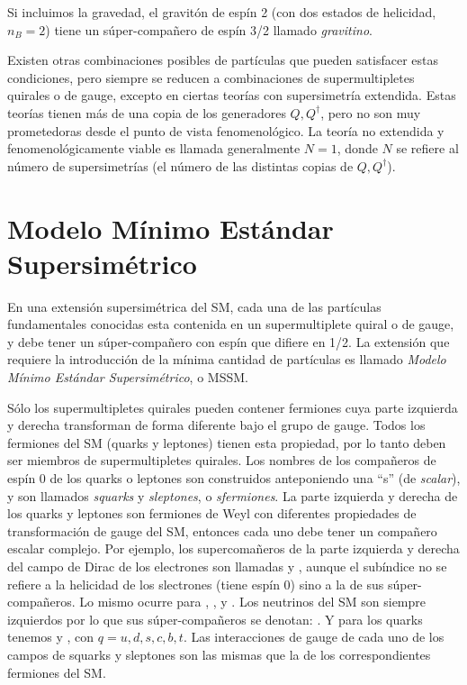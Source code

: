 Si incluimos la gravedad, el gravitón de espín 2 (con dos estados de helicidad,
$n_B=2$) tiene un súper-compañero de espín 3/2 llamado \emph{gravitino}.

Existen otras combinaciones posibles de partículas que pueden satisfacer estas
condiciones, pero siempre se reducen a combinaciones de supermultipletes
quirales o de gauge, excepto en ciertas teorías con supersimetría extendida.
Estas teorías tienen más de una copia de los generadores $Q, Q^\dagger$, pero no
son muy prometedoras desde el punto de vista fenomenológico. La teoría no
extendida y fenomenológicamente viable es llamada generalmente $N=1$, donde $N$
se refiere al número de supersimetrías (el número de las distintas copias de
$Q,Q^\dagger$).


\section{Modelo Mínimo Estándar Supersimétrico}

En una extensión supersimétrica del SM, cada una de las partículas fundamentales
conocidas esta contenida en un supermultiplete quiral o de gauge, y debe tener
un súper-compa\~nero con espín que difiere en 1/2. La extensión que requiere la
introducción de la mínima cantidad de partículas es llamado \emph{Modelo Mínimo
  Estándar Supersimétrico}, o MSSM.


Sólo los supermultipletes quirales pueden contener fermiones cuya parte
izquierda y derecha transforman de forma diferente bajo el grupo de gauge. Todos
los fermiones del SM (quarks y leptones) tienen esta propiedad, por lo tanto
deben ser miembros de supermultipletes quirales. Los nombres de los compañeros
de espín 0 de los quarks o leptones son construidos anteponiendo una ``s'' (de
\emph{scalar}), y son llamados \emph{squarks} y \emph{sleptones}, o
\emph{sfermiones}. La parte izquierda y derecha de los quarks y leptones son
fermiones de Weyl con diferentes propiedades de transformación de gauge del SM,
entonces cada uno debe tener un compañero escalar complejo. Por ejemplo, los
supercomañeros de la parte izquierda y derecha del campo de Dirac de los
electrones son llamadas {\selL} y {\selR}, aunque el subíndice no se refiere a
la helicidad de los slectrones (tiene espín 0) sino a la de sus súper-compañeros.
Lo mismo ocurre para {\smuL}, {\smuR}, {\stauL} y {\stauR}. Los neutrinos del SM
son siempre izquierdos por lo que sus súper-compañeros se denotan: {\snu}. Y
para los quarks tenemos {\squarkL} y {\squarkR}, con $q = u, d, s, c, b, t$. Las
interacciones de gauge de cada uno de los campos de squarks y sleptones son las
mismas que la de los correspondientes fermiones del SM.

